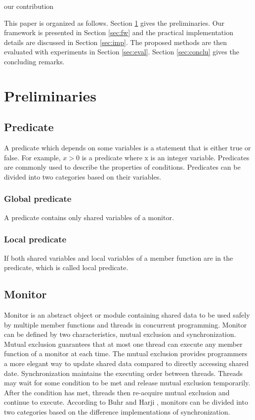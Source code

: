 \documentclass[10pt, conference, compsocconf]{IEEEtran}
\begin{document}
our contribution

This paper is organized as follows. Section \ref{sec:pre} gives the
preliminaries. 
Our framework is presented in Section \ref{sec:fw} and the practical 
implementation details are discussed in Section \ref{sec:imp}. The proposed 
methods are then evaluated with experiments in Section \ref{sec:eval}. 
Section \ref{sec:conclu} gives the concluding remarks.

\section{Preliminaries} \label{sec:pre}
\subsection{Predicate}
A predicate which depends on some variables is a statement that is either true
or false. For example, $x > 0$ is a predicate where x is an integer variable. 
Predicates are commonly used to describe the properties of conditions. 
Predicates can be divided into two categories based on their variables.
\subsubsection{Global predicate} A predicate contains only shared variables of a
    monitor. 
\subsubsection{Local predicate} If both shared variables and local variables of a
    member function are in the predicate, which is called local predicate. 

\subsection{Monitor}
Monitor is an abstract object or module containing shared data to be used safely
by multiple member functions and threads in concurrent programming. Monitor can
be defined by two characteristics, mutual exclusion and synchronization. Mutual 
exclusion guarantees that at most one thread can execute any member function of 
a monitor at each time. The mutual exclusion provides programmers a more elegant
way to update shared data compared to directly accessing shared date. 
Synchronization maintains the executing order between threads. Threads may wait
for some condition to be met and release mutual exclusion temporarily. After the
condition has met, threads then re-acquire mutual exclusion and continue to 
execute.
According to Buhr and Harji \cite{bh05}, monitors can be divided into two 
categories based on the difference implementations of synchronization. 
\end{document}
